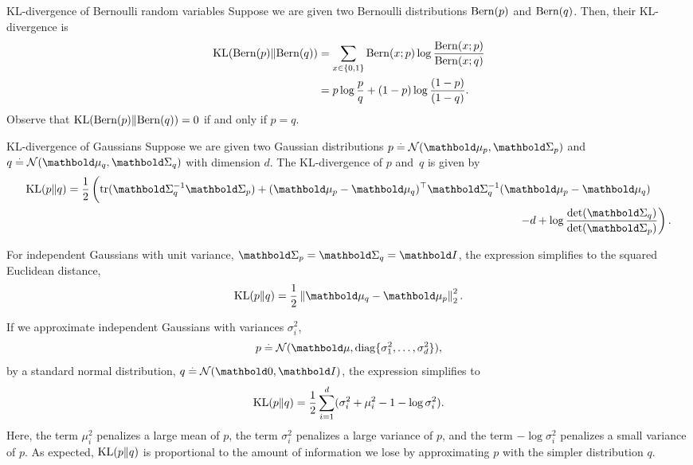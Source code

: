 \begin{ex}{KL-divergence of Bernoulli random variables}{}
  Suppose we are given two Bernoulli distributions $\Bern{p}$ and $\Bern{q}$.
  Then, their KL-divergence is \begin{align}
    \KL{\Bern{p}}{\Bern{q}} &= \sum_{x \in \{0,1\}} \Bern[x]{p} \log \frac{\Bern[x]{p}}{\Bern[x]{q}} \nonumber\\
    &= p \log \frac{p}{q} + (1-p) \log \frac{(1-p)}{(1-q)}.
  \end{align}
  Observe that $\KL{\Bern{p}}{\Bern{q}} = 0$ if and only if $p = q$.
\end{ex}

\begin{ex}{KL-divergence of Gaussians}{}
  Suppose we are given two Gaussian distributions ${p \defeq \N{\vmu_p}{\mSigma_p}}$ and ${q \defeq \N{\vmu_q}{\mSigma_q}}$ with dimension $d$.
  The KL-divergence of $p$ and~$q$ is given by  \begin{align}
    \begin{multlined}[t]
    \KL{p}{q} = \frac{1}{2} \left(\mathrm{tr}(\inv{\mSigma_q} \mSigma_p) + \transpose{(\vmu_p - \vmu_q)} \inv{\mSigma_q} (\vmu_p - \vmu_q) \phantom{\frac12}\right. \\ \left. - d + \log \frac{\det{\mSigma_q}}{\det{\mSigma_p}}\right).
    \end{multlined} \label{eq:kl_gaussian}
  \end{align}

  For independent Gaussians with unit variance, $\mSigma_p = \mSigma_q = \mI$, the expression simplifies to the squared Euclidean distance, \begin{align}
    \KL{p}{q} = \frac{1}{2} \norm{\vmu_q - \vmu_p}_2^2.
  \end{align}

  If we approximate independent Gaussians with variances $\sigma_i^2$, \begin{align*}
    p \defeq \N{\vmu}{\diag{\sigma_1^2, \dots, \sigma_d^2}},
  \end{align*} by a standard normal distribution, ${q \defeq \SN}$, the expression simplifies to \begin{align}
    \KL{p}{q} = \frac{1}{2} \sum_{i=1}^d (\sigma_i^2 + \mu_i^2 - 1 - \log \sigma_i^2). \label{eq:kl_brl}
  \end{align}
  Here, the term $\mu_i^2$ penalizes a large mean of $p$, the term $\sigma_i^2$ penalizes a large variance of $p$, and the term $- \log \sigma_i^2$ penalizes a small variance of $p$.
  As expected, $\KL{p}{q}$ is proportional to the amount of information we lose by approximating $p$ with the simpler distribution $q$.
\end{ex}

